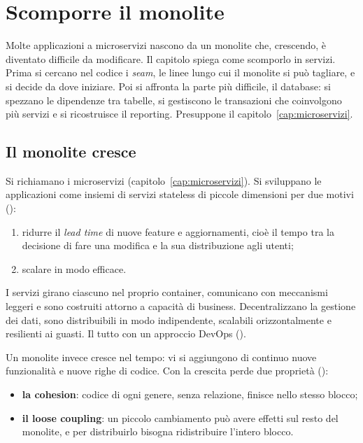 \chapter{Scomporre il monolite}
\label{cap:monolite}

\begin{inbreve}
Molte applicazioni a microservizi nascono da un monolite che, crescendo, è diventato difficile da modificare. Il
capitolo spiega come scomporlo in servizi. Prima si cercano nel codice i \emph{seam}, le linee lungo cui il monolite
si può tagliare, e si decide da dove iniziare. Poi si affronta la parte più difficile, il database: si spezzano le
dipendenze tra tabelle, si gestiscono le transazioni che coinvolgono più servizi e si ricostruisce il reporting.
Presuppone il capitolo~\ref{cap:microservizi}.
\end{inbreve}

\section{Il monolite cresce}
\label{sec:split-monolite}

Si richiamano i microservizi (capitolo~\ref{cap:microservizi}). Si sviluppano le applicazioni come insiemi di servizi
stateless di piccole dimensioni per due motivi ():
\begin{enumerate}
  \item ridurre il \emph{lead time} di nuove feature e aggiornamenti, cioè il tempo tra la decisione di fare una
    modifica e la sua distribuzione agli utenti;
  \item scalare in modo efficace.
\end{enumerate}
I servizi girano ciascuno nel proprio container, comunicano con meccanismi leggeri e sono costruiti attorno a
capacità di business. Decentralizzano la gestione dei dati, sono distribuibili in modo indipendente, scalabili
orizzontalmente e resilienti ai guasti. Il tutto con un approccio DevOps ().

Un monolite invece cresce nel tempo: vi si aggiungono di continuo nuove funzionalità e nuove righe di codice. Con la
crescita perde due proprietà ():
\begin{itemize}
  \item \textbf{la cohesion}: codice di ogni genere, senza relazione, finisce nello stesso blocco;
  \item \textbf{il loose coupling}: un piccolo cambiamento può avere effetti sul resto del monolite, e per
    distribuirlo bisogna ridistribuire l'intero blocco.
\end{itemize}


